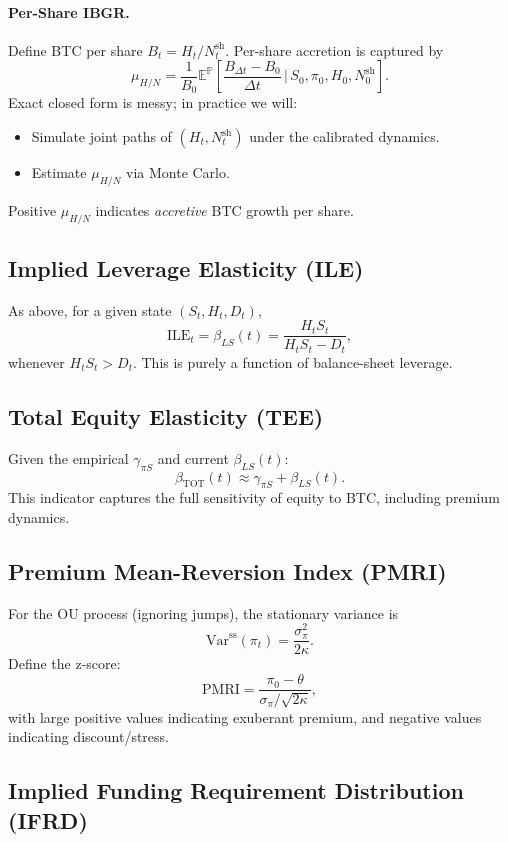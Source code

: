 \documentclass[11pt]{article}
\begin{document}
\paragraph{Per-Share IBGR.}
Define BTC per share $B_t = H_t / N_t^{\text{sh}}$.
Per-share accretion is captured by
$$
  \mu_{H/N}
  =
  \frac{1}{B_0}
  \mathbb E^\mathbb P
  \left[
    \frac{B_{\Delta t} - B_0}{\Delta t}
    \,\bigg|\,
    S_0, \pi_0, H_0, N_0^{\text{sh}}
  \right].
$$
Exact closed form is messy; in practice we will:
\begin{itemize}
  \item Simulate joint paths of $(H_t,N_t^{\text{sh}})$ under the calibrated dynamics.
  \item Estimate $\mu_{H/N}$ via Monte Carlo.
\end{itemize}
Positive $\mu_{H/N}$ indicates \emph{accretive} BTC growth per share.

\subsection{Implied Leverage Elasticity (ILE)}

As above, for a given state $(S_t,H_t,D_t)$,
$$
  \text{ILE}_t = \beta_{LS}(t)
  = \frac{H_t S_t}{H_t S_t - D_t},
$$
whenever $H_t S_t > D_t$.
This is purely a function of balance-sheet leverage.

\subsection{Total Equity Elasticity (TEE)}

Given the empirical $\gamma_{\pi S}$ and current $\beta_{LS}(t)$:
$$
  \beta_{\text{TOT}}(t)
  \approx \gamma_{\pi S} + \beta_{LS}(t).
$$
This indicator captures the full sensitivity of equity to BTC, including premium dynamics.

\subsection{Premium Mean-Reversion Index (PMRI)}

For the OU process (ignoring jumps), the stationary variance is
$$
  \text{Var}^{\text{ss}}(\pi_t) = \frac{\sigma_\pi^2}{2\kappa}.
$$
Define the z-score:
$$
  \text{PMRI} =
  \frac{\pi_0 - \theta}{\sigma_\pi / \sqrt{2\kappa}},
$$
with large positive values indicating exuberant premium, and negative values indicating discount/stress.

\subsection{Implied Funding Requirement Distribution (IFRD)}
\end{document}
